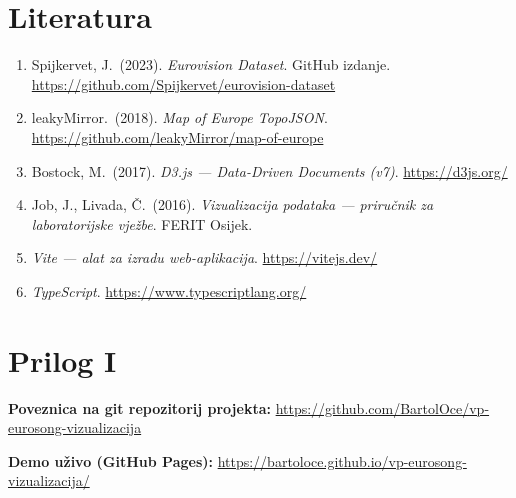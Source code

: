 \documentclass[a4paper,11pt]{article}
\begin{document}
\clearpage
\section*{Literatura}

\begin{enumerate}
  \item Spijkervet, J.\ (2023). \emph{Eurovision Dataset}. GitHub izdanje. \\\url{https://github.com/Spijkervet/eurovision-dataset}
  \item leakyMirror.\ (2018). \emph{Map of Europe TopoJSON}. \\\url{https://github.com/leakyMirror/map-of-europe}
  \item Bostock, M.\ (2017). \emph{D3.js --- Data-Driven Documents (v7)}. \url{https://d3js.org/}
  \item Job, J., Livada, Č.\ (2016). \emph{Vizualizacija podataka --- priručnik za laboratorijske vježbe}. FERIT Osijek.
  \item \emph{Vite --- alat za izradu web-aplikacija}. \url{https://vitejs.dev/}
  \item \emph{TypeScript}. \url{https://www.typescriptlang.org/}
\end{enumerate}

\clearpage
\section*{Prilog I}

\textbf{Poveznica na git repozitorij projekta:} \url{https://github.com/BartolOce/vp-eurosong-vizualizacija}

\textbf{Demo uživo (GitHub Pages):} \url{https://bartoloce.github.io/vp-eurosong-vizualizacija/}
\end{document}
